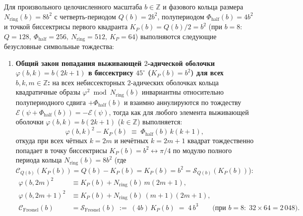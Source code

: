 \begin{theorem}[Общий символьный закон стационарной фазы Френеля для произвольного масштаба $b \in \mathbb{Z}$, тождество нормы Гаусса--Планшереля и безтейлоровский переход к $\int_0^\infty \cos(x^2)\,dx = \int_0^\infty \sin(x^2)\,dx = \frac{1}{2}\sqrt{\frac{\pi}{2}}$]
\label{thm:math-fresnel-cornu-continuum-bridge}
\leanok
Для произвольного целочисленного масштаба $b \in \mathbb{Z}$ и фазового кольца размера $N_{\mathrm{ring}}(b) = 8b^2$ с четверть-периодом $Q(b) = 2b^2$, полупериодом $\Phi_{\mathrm{half}}(b) = 4b^2$ и точкой биссектрисы первого квадранта $K_P(b) = Q(b)/2 = b^2$ (при $b = 8$: $Q = 128,\ \Phi_{\mathrm{half}} = 256,\ N_{\mathrm{ring}} = 512,\ K_P = 64$) выполняются следующие безусловные символьные тождества:
\begin{enumerate}[label=\textbf{(\arabic*)},leftmargin=*]
\item \textbf{Общий закон попадания выживающей $2$-адической оболочки $\varphi(b, k) = b(2k+1)$ в биссектрису $45^\circ$ ($K_P(b) = b^2$) для всех $b, k, m \in \mathbb{Z}$:}
  на всех небиссекторных $2$-адических оболочках кольца квадратичные образы $\varphi^2 \bmod N_{\mathrm{ring}}(b)$ инвариантны относительно полупериодного сдвига $+\Phi_{\mathrm{half}}(b)$ и взаимно аннулируются по тождеству $\mathcal{E}(\psi + \Phi_{\mathrm{half}}(b)) = -\mathcal{E}(\psi)$, тогда как для любого элемента выживающей оболочки $\varphi(b, k) = b(2k+1)$ ($k \in \mathbb{Z}$) выполняется:
  \begin{equation}
    \label{eq:math-fresnel-four-shells-zero}
    \varphi(b, k)^2 - K_P(b) \;\equiv\; \Phi_{\mathrm{half}}(b)\,k(k+1),
  \end{equation}
  откуда при всех чётных $k = 2m$ и нечётных $k = 2m+1$ квадрат тождественно попадает в точку биссектрисы $K_P(b) = b^2 \leftrightarrow \pi/4$ по модулю полного периода кольца $N_{\mathrm{ring}}(b) = 8b^2$ (где $\mathcal{C}_{Q(b)}(K_P(b)) = Q(b) - K_P(b) = K_P(b) = b^2 = \mathcal{S}_{Q(b)}(K_P(b))$):
  \begin{align}
    \varphi(b, 2m)^2 &\equiv K_P(b) + N_{\mathrm{ring}}(b)\,m(2m+1), \label{eq:math-discrete-fresnel-even} \\
    \varphi(b, 2m+1)^2 &\equiv K_P(b) + N_{\mathrm{ring}}(b)\,(m+1)(2m+1), \label{eq:math-discrete-fresnel-odd} \\
    \mathcal{C}_{\mathrm{Fresnel}}(b) &= \mathcal{S}_{\mathrm{Fresnel}}(b) \;:=\; (4b)\,K_P(b) \;=\; 4\,b^3 \qquad \bigl(\text{при } b = 8:\; 32 \times 64 = 2\,048\bigr). \label{eq:math-discrete-fresnel-symmetry}

\end{align}
\end{enumerate}
\end{theorem}

